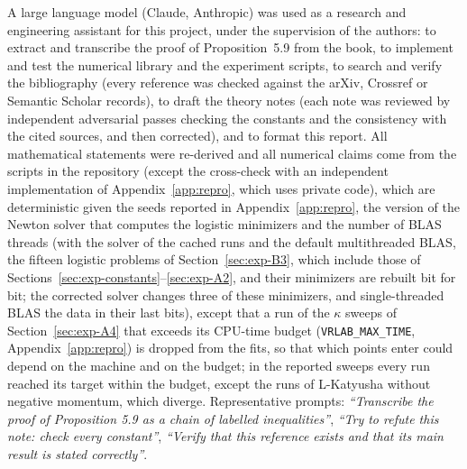 A large language model (Claude, Anthropic) was used as a research and engineering assistant for this project, under
the supervision of the authors: to extract and transcribe the proof of Proposition~5.9 from the book, to implement
and test the numerical library and the experiment scripts, to search and verify the bibliography (every reference
was checked against the arXiv, Crossref or Semantic Scholar records), to draft the theory notes (each note was
reviewed by independent adversarial passes checking the constants and the consistency with the cited sources,
and then corrected), and to format this report. All mathematical statements were re-derived and all numerical
claims come from the scripts in the repository (except the cross-check with an independent implementation of
Appendix~\ref{app:repro}, which uses private code), which are deterministic given the seeds reported in
Appendix~\ref{app:repro}, the version of the Newton solver that computes the logistic minimizers and the number of
BLAS threads (with the solver of the cached runs and the default multithreaded BLAS, the fifteen logistic problems of
Section~\ref{sec:exp-B3}, which include those of Sections~\ref{sec:exp-constants}--\ref{sec:exp-A2}, and their
minimizers are rebuilt bit for bit; the corrected solver changes three of these minimizers, and single-threaded BLAS
the data in their last bits), except that a run of the $\kappa$ sweeps of Section~\ref{sec:exp-A4} that exceeds
its CPU-time budget (\nolinkurl{VRLAB_MAX_TIME}, Appendix~\ref{app:repro}) is dropped from the fits, so that which points
enter could depend on the machine and on the budget; in the reported sweeps every run reached its target within the
budget, except the runs of L-Katyusha without negative momentum, which diverge. Representative prompts:
\emph{``Transcribe the proof of Proposition 5.9 as a chain of labelled inequalities''}, \emph{``Try to refute this note:
check every constant''}, \emph{``Verify that this reference exists and that its main result is stated correctly''}.
